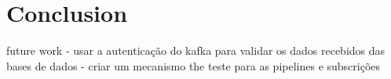 \chapter{Conclusion}
\label{chapter:conclusion}

future work
- usar a autenticação do kafka para validar os dados recebidos das bases de dados
- criar um mecanismo the teste para as pipelines e subscrições
